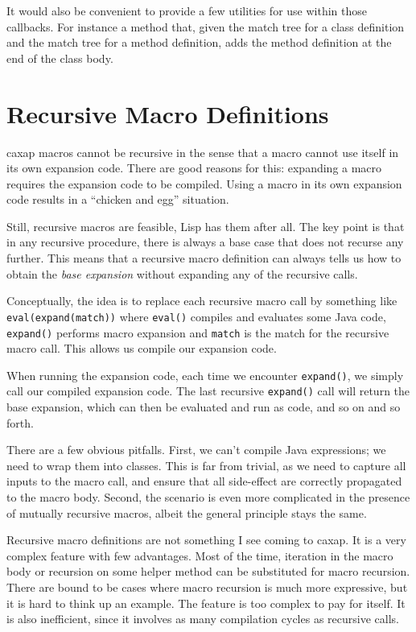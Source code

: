 It would also be convenient to provide a few utilities for use within those
callbacks. For instance a method that, given the match tree for a class
definition and the match tree for a method definition, adds the method
definition at the end of the class body.

\section{Recursive Macro Definitions}

caxap macros cannot be recursive in the sense that a macro cannot use itself in
its own expansion code. There are good reasons for this: expanding a macro
requires the expansion code to be compiled. Using a macro in its own expansion
code results in a ``chicken and egg'' situation.

Still, recursive macros are feasible, Lisp has them after all. The key point is
that in any recursive procedure, there is always a base case that does not
recurse any further. This means that a recursive macro definition can always
tells us how to obtain the \emph{base expansion} without expanding any of the
recursive calls.

Conceptually, the idea is to replace each recursive macro call by something like
\texttt{eval(expand(match))} where \texttt{eval()} compiles and evaluates some
Java code, \texttt{expand()} performs macro expansion and \texttt{match} is the
match for the recursive macro call. This allows us compile our expansion code.

When running the expansion code, each time we encounter \texttt{expand()}, we
simply call our compiled expansion code. The last recursive \texttt{expand()}
call will return the base expansion, which can then be evaluated and run as
code, and so on and so forth.

There are a few obvious pitfalls. First, we can't compile Java expressions; we
need to wrap them into classes. This is far from trivial, as we need to capture
all inputs to the macro call, and ensure that all side-effect are correctly
propagated to the macro body. Second, the scenario is even more complicated in
the presence of mutually recursive macros, albeit the general principle stays
the same.

Recursive macro definitions are not something I see coming to caxap. It is a
very complex feature with few advantages. Most of the time, iteration in the
macro body or recursion on some helper method can be substituted for macro
recursion. There are bound to be cases where macro recursion is much more
expressive, but it is hard to think up an example. The feature is too complex to
pay for itself. It is also inefficient, since it involves as many compilation
cycles as recursive calls.

